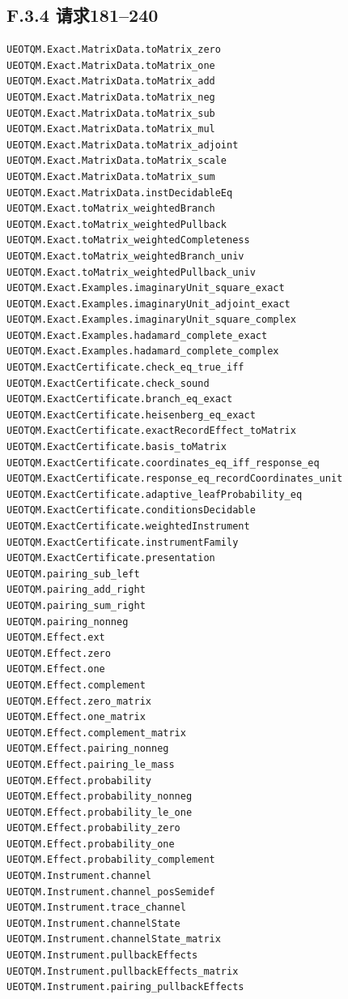 \documentclass[
  11pt,
  oneside]{book}
\begin{document}
\subsection{F.3.4 请求181--240}

\begin{Verbatim}[breaklines,breakanywhere,fontsize=\scriptsize]
UEOTQM.Exact.MatrixData.toMatrix_zero
UEOTQM.Exact.MatrixData.toMatrix_one
UEOTQM.Exact.MatrixData.toMatrix_add
UEOTQM.Exact.MatrixData.toMatrix_neg
UEOTQM.Exact.MatrixData.toMatrix_sub
UEOTQM.Exact.MatrixData.toMatrix_mul
UEOTQM.Exact.MatrixData.toMatrix_adjoint
UEOTQM.Exact.MatrixData.toMatrix_scale
UEOTQM.Exact.MatrixData.toMatrix_sum
UEOTQM.Exact.MatrixData.instDecidableEq
UEOTQM.Exact.toMatrix_weightedBranch
UEOTQM.Exact.toMatrix_weightedPullback
UEOTQM.Exact.toMatrix_weightedCompleteness
UEOTQM.Exact.toMatrix_weightedBranch_univ
UEOTQM.Exact.toMatrix_weightedPullback_univ
UEOTQM.Exact.Examples.imaginaryUnit_square_exact
UEOTQM.Exact.Examples.imaginaryUnit_adjoint_exact
UEOTQM.Exact.Examples.imaginaryUnit_square_complex
UEOTQM.Exact.Examples.hadamard_complete_exact
UEOTQM.Exact.Examples.hadamard_complete_complex
UEOTQM.ExactCertificate.check_eq_true_iff
UEOTQM.ExactCertificate.check_sound
UEOTQM.ExactCertificate.branch_eq_exact
UEOTQM.ExactCertificate.heisenberg_eq_exact
UEOTQM.ExactCertificate.exactRecordEffect_toMatrix
UEOTQM.ExactCertificate.basis_toMatrix
UEOTQM.ExactCertificate.coordinates_eq_iff_response_eq
UEOTQM.ExactCertificate.response_eq_recordCoordinates_unit
UEOTQM.ExactCertificate.adaptive_leafProbability_eq
UEOTQM.ExactCertificate.conditionsDecidable
UEOTQM.ExactCertificate.weightedInstrument
UEOTQM.ExactCertificate.instrumentFamily
UEOTQM.ExactCertificate.presentation
UEOTQM.pairing_sub_left
UEOTQM.pairing_add_right
UEOTQM.pairing_sum_right
UEOTQM.pairing_nonneg
UEOTQM.Effect.ext
UEOTQM.Effect.zero
UEOTQM.Effect.one
UEOTQM.Effect.complement
UEOTQM.Effect.zero_matrix
UEOTQM.Effect.one_matrix
UEOTQM.Effect.complement_matrix
UEOTQM.Effect.pairing_nonneg
UEOTQM.Effect.pairing_le_mass
UEOTQM.Effect.probability
UEOTQM.Effect.probability_nonneg
UEOTQM.Effect.probability_le_one
UEOTQM.Effect.probability_zero
UEOTQM.Effect.probability_one
UEOTQM.Effect.probability_complement
UEOTQM.Instrument.channel
UEOTQM.Instrument.channel_posSemidef
UEOTQM.Instrument.trace_channel
UEOTQM.Instrument.channelState
UEOTQM.Instrument.channelState_matrix
UEOTQM.Instrument.pullbackEffects
UEOTQM.Instrument.pullbackEffects_matrix
UEOTQM.Instrument.pairing_pullbackEffects
\end{Verbatim}
\end{document}
